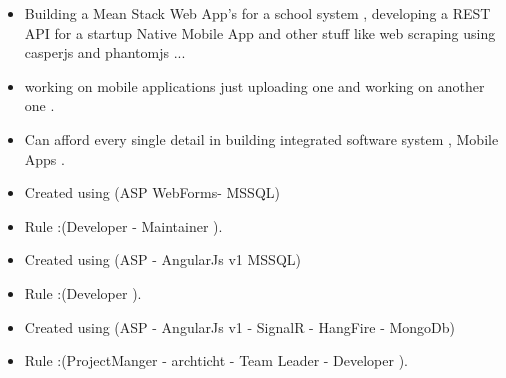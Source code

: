 \documentclass[10pt,a4paper]{altacv}
\begin{document}
\divider

\begin{itemize}
\item 
Building a Mean Stack Web App's for a school system , developing a REST API for a startup Native Mobile App and other stuff like web scraping using casperjs and phantomjs ... 
\end{itemize}

\divider

\begin{itemize}
\item working on mobile applications just uploading one and working on another one . 
\end{itemize}

\divider

\begin{itemize}
\item Can afford every single detail in building integrated software system , Mobile Apps .
\end{itemize}


\begin{itemize}
\item Created using (ASP WebForms- MSSQL) 
\item Rule :(Developer - Maintainer ). 
\end{itemize}
\divider

\begin{itemize}
\item Created using (ASP - AngularJs v1 MSSQL) 
\item Rule :(Developer ). 
\end{itemize}
\divider


\begin{itemize}
\item Created using (ASP - AngularJs v1 - SignalR - HangFire - MongoDb) 
\item Rule :(ProjectManger - archticht - Team Leader - Developer ). 
\end{itemize}
\divider
\end{document}
